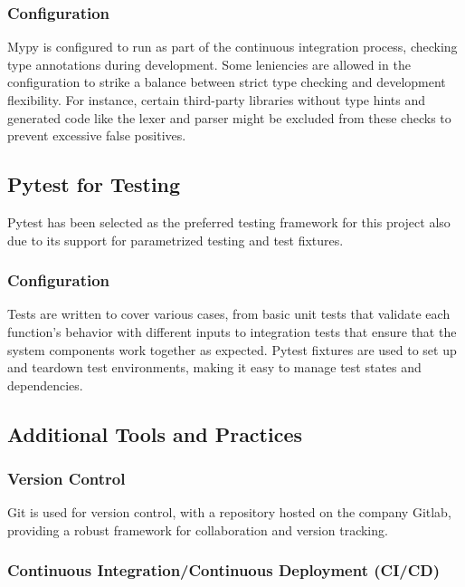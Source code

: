 \subsubsection{Configuration}
Mypy is configured to run as part of the continuous integration process, checking type annotations during development. Some leniencies are allowed in the configuration to strike a balance between strict type checking and development flexibility. For instance, certain third-party libraries without type hints and generated code like the lexer and parser might be excluded from these checks to prevent excessive false positives.

\subsection{Pytest for Testing}

Pytest\cite{pytest} has been selected as the preferred testing framework for this project also due to its support for parametrized testing and test fixtures.

\subsubsection{Configuration}

Tests are written to cover various cases, from basic unit tests that validate each function's behavior with different inputs to integration tests that ensure that the system components work together as expected. Pytest fixtures\cite{pytest_fixtures} are used to set up and teardown test environments, making it easy to manage test states and dependencies.

\subsection{Additional Tools and Practices}

\subsubsection{Version Control}

Git is used for version control, with a repository hosted on the company Gitlab, providing a robust framework for collaboration and version tracking.

\subsubsection{Continuous Integration/Continuous Deployment (CI/CD)}

